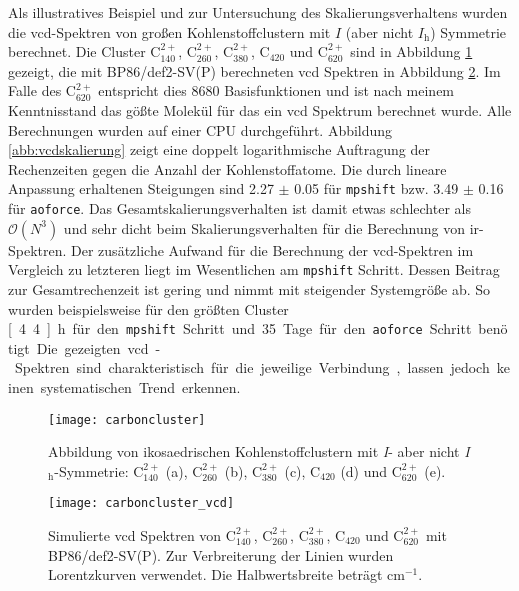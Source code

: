 \FloatBarrier
Als illustratives Beispiel und zur Untersuchung des Skalierungsverhaltens wurden die \ac{vcd}-Spektren von großen Kohlenstoffclustern mit $I$ (aber nicht $I_\textrm{h}$) Symmetrie berechnet. Die Cluster C$^{2+}_{140}$, C$^{2+}_{260}$, C$^{2+}_{380}$, C$_{420}$ und C$^{2+}_{620}$ sind in Abbildung \ref{abb:carboncluster} gezeigt, die mit BP86/def2-SV(P) berechneten \ac{vcd} Spektren in Abbildung \ref{abb:carboncluster_vcd}. Im Falle des C$^{2+}_{620}$ entspricht dies 8680 Basisfunktionen und ist nach meinem Kenntnisstand das gößte Molekül für das ein \ac{vcd} Spektrum berechnet wurde. Alle Berechnungen wurden auf einer CPU durchgeführt. Abbildung \ref{abb:vcdskalierung} zeigt eine doppelt logarithmische Auftragung der Rechenzeiten gegen die Anzahl der Kohlenstoffatome. Die durch lineare Anpassung erhaltenen Steigungen sind 2.27 $\pm$ 0.05 für \texttt{mpshift} bzw. 3.49 $\pm$ 0.16 für \texttt{aoforce}. Das Gesamtskalierungsverhalten ist damit etwas schlechter als $\mathcal{O}(N^3)$ und sehr dicht beim Skalierungsverhalten für die Berechnung von \ac{ir}-Spektren. Der zusätzliche Aufwand für die Berechnung der \ac{vcd}-Spektren im Vergleich zu letzteren liegt im Wesentlichen am \texttt{mpshift} Schritt. Dessen Beitrag zur Gesamtrechenzeit ist gering und nimmt mit steigender Systemgröße ab. So wurden beispielsweise für den größten Cluster \unit[4.4]{h} für den \texttt{mpshift} Schritt und 35 Tage für den \texttt{aoforce} Schritt benötigt. Die gezeigten \ac{vcd}-Spektren sind charakteristisch für die jeweilige Verbindung, lassen jedoch keinen systematischen Trend erkennen.
\begin{figure}[ht!]
	\centering
	\texttt{[image: carboncluster]}
	\captionsetup{figurewithin = chapter}
	\captionsetup{font=small, labelfont=bf}\caption[Abbildung von ikosaedrischen Kohlenstoffclustern]{Abbildung von ikosaedrischen Kohlenstoffclustern mit \textit{I}- aber nicht \textit{I}$_\textrm{h}$-Symmetrie: C$^{2+}_{140}$ (a), C$^{2+}_{260}$ (b), C$^{2+}_{380}$ (c), C$_{420}$ (d) und C$^{2+}_{620}$ (e).}
\label{abb:carboncluster}
\end{figure}

\begin{figure}[ht!]
	\centering
	\texttt{[image: carboncluster\_vcd]}
	\captionsetup{figurewithin = chapter}
	\captionsetup{font=small, labelfont=bf}\caption[Simulierte \ac{vcd} Spektren von ikosaedrischen Kohlenstoffclustern]{Simulierte \ac{vcd} Spektren von C$^{2+}_{140}$, C$^{2+}_{260}$, C$^{2+}_{380}$, C$_{420}$ und C$^{2+}_{620}$ mit BP86/def2-SV(P). Zur Verbreiterung der Linien wurden Lorentzkurven verwendet. Die Halbwertsbreite beträgt \unit[4]{cm$^{-1}$}.}
\label{abb:carboncluster_vcd}
\end{figure}

